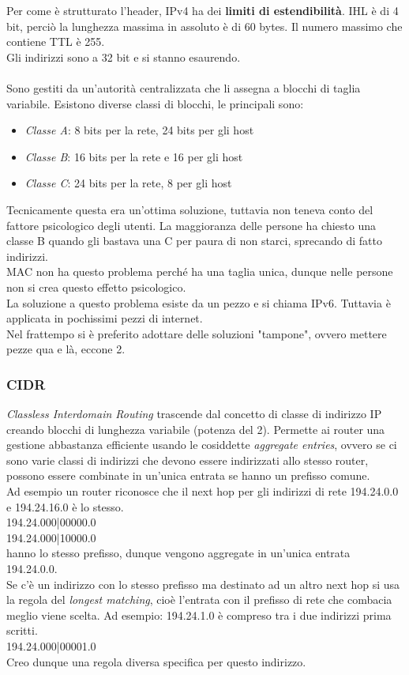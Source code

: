 \documentclass[10pt,a4paper,twoside]{article}
\begin{document}
Per come è strutturato l'header, IPv4 ha dei \textbf{limiti di estendibilità}. IHL è di 4 bit, perciò la lunghezza massima in assoluto è di 60 bytes. Il numero massimo che contiene TTL è 255.\\
Gli indirizzi sono a 32 bit e si stanno esaurendo.\\\\
Sono gestiti da un'autorità centralizzata che li assegna a blocchi di taglia variabile. Esistono diverse classi di blocchi, le principali sono:
\begin{itemize}
\item \textit{Classe A}: 8 bits per la rete, 24 bits per gli host
\item \textit{Classe B}: 16 bits per la rete e 16 per gli host
\item \textit{Classe C}: 24 bits per la rete, 8 per gli host
\end{itemize}
Tecnicamente questa era un'ottima soluzione, tuttavia non teneva conto del fattore psicologico degli utenti. La maggioranza delle persone ha chiesto una classe B quando gli bastava una C per paura di non starci, sprecando di fatto indirizzi.\\
MAC non ha questo problema perché ha una taglia unica, dunque nelle persone non si crea questo effetto psicologico.\\
La soluzione a questo problema esiste da un pezzo e si chiama IPv6. Tuttavia è applicata in pochissimi pezzi di internet.\\
Nel frattempo si è preferito adottare delle soluzioni "tampone", ovvero mettere pezze qua e là, eccone 2.

\subsubsection{CIDR}
\textit{Classless Interdomain Routing} trascende dal concetto di classe di indirizzo IP creando blocchi di lunghezza variabile (potenza del 2). Permette ai router una gestione abbastanza efficiente usando le cosiddette \textit{aggregate entries}, ovvero se ci sono varie classi di indirizzi che devono essere indirizzati allo stesso router, possono essere combinate in un'unica entrata se hanno un prefisso comune.\\
Ad esempio un router riconosce che il next hop per gli indirizzi di rete 194.24.0.0 e 194.24.16.0 è lo stesso.\\
194.24.000|00000.0\\
194.24.000|10000.0\\
hanno lo stesso prefisso, dunque vengono aggregate in un'unica entrata 194.24.0.0.\\
Se c'è un indirizzo con lo stesso prefisso ma destinato ad un altro next hop si usa la regola del \textit{longest matching}, cioè l'entrata con il prefisso di rete che combacia meglio viene scelta. Ad esempio: 194.24.1.0 è compreso tra i due indirizzi prima scritti.\\
194.24.000|00001.0\\
Creo dunque una regola diversa specifica per questo indirizzo.
\end{document}
